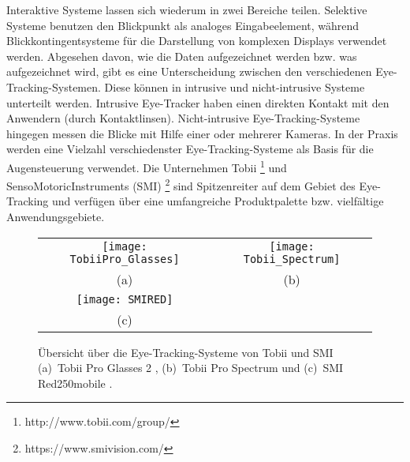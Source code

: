 \newline \newline
Interaktive Systeme lassen sich wiederum in zwei Bereiche teilen. Selektive Systeme benutzen den Blickpunkt als analoges Eingabeelement, während Blickkontingentsysteme für die Darstellung von komplexen Displays verwendet werden. 
\newline \newline
Abgesehen davon, wie die Daten aufgezeichnet werden bzw. was aufgezeichnet wird, gibt es eine Unterscheidung zwischen den verschiedenen Eye-Tracking-Systemen. Diese können in intrusive und nicht-intrusive Systeme unterteilt werden. Intrusive Eye-Tracker haben einen direkten Kontakt mit den Anwendern (\zB durch Kontaktlinsen). Nicht-intrusive Eye-Tracking-Systeme hingegen messen die Blicke mit Hilfe einer oder mehrerer Kameras. 
\newline \newline
In der Praxis werden eine Vielzahl verschiedenster Eye-Tracking-Systeme als Basis für die Augensteuerung verwendet. Die Unternehmen Tobii%
\footnote{http://www.tobii.com/group/}
%
und SensoMotoricInstruments (SMI)%
\footnote{https://www.smivision.com/}
%
sind Spitzenreiter auf dem Gebiet des Eye-Tracking und verfügen über eine umfangreiche Produktpalette bzw. vielfältige Anwendungsgebiete. 
\begin{figure}
\centering\small
\setlength{\tabcolsep}{0mm}	%
\begin{tabular}{c@{\hspace{-15mm}}c} %
  \texttt{[image: TobiiPro\_Glasses]} &
  \texttt{[image: Tobii\_Spectrum]}
\\
  (a) & (b)
\\[4pt]	%
  \texttt{[image: SMIRED]}
\\
  (c)
\end{tabular}
%
\caption{Übersicht über die Eye-Tracking-Systeme von Tobii und SMI \newline
(a)~Tobii Pro Glasses 2 \cite{TobiiGlasses}, (b)~Tobii Pro Spectrum \cite{TobiiSpectrum} und (c)~SMI Red250mobile \cite{SMIRED}.}
\label{fig:Tobii}
\end{figure}
\newline \newline
